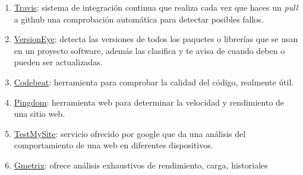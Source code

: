 \begin{enumerate}
	\item \href{https://travis-ci.org/}{Travis}: sistema de integración continua que realiza cada vez que haces un \emph{pull} a github una comprobación automática para detectar posibles fallos.
	\item \href{https://www.versioneye.com/}{VersionEye}: detecta las versiones de todos los paquetes o librerías que se usan en un proyecto software, además las clasifica y te avisa de cuando deben o pueden ser actualizadas. 
	\item \href{https://codebeat.co/}{Codebeat}: herramienta para comprobar la calidad del código, realmente  útil.
    \item \href{https://tools.pingdom.com}{Pingdom}: herramienta web para determinar la velocidad y rendimiento de una sitio web.
    
    

	\item \href{https://testmysite.withgoogle.com}{TestMySite}: servicio ofrecido por google que da una análisis del comportamiento de una web en diferentes dispositivos.
	\item \href{https://gtmetrix.com/	}{Gmetrix}: ofrece análisis exhaustivos de rendimiento, carga, historiales
	

	\end{enumerate}
	
	
	


